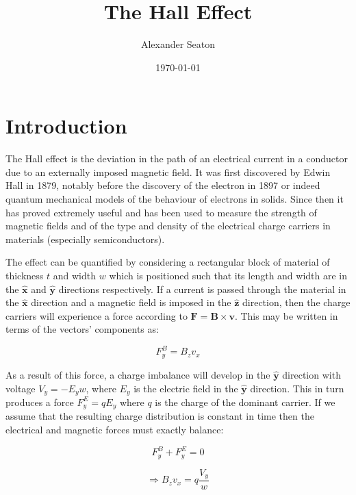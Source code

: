 \documentclass{article}
\title{The Hall Effect}
\date{\today}
\author{Alexander Seaton}
\begin{document}
	\maketitle
	\begin{abstract}
		
	\end{abstract}
	\section{Introduction}
		The Hall effect is the deviation in the path of an electrical current in a conductor due to an externally imposed magnetic field. It was first discovered by Edwin Hall in 1879, notably before the discovery of the electron in 1897 or indeed quantum mechanical models of the behaviour of electrons in solids. Since then it has proved extremely useful and has been used to measure the strength of magnetic fields and of the type and density of the electrical charge carriers in materials (especially semiconductors).
		
		The effect can be quantified by considering a rectangular block of material of thickness $t$ and width $w$ which is positioned such that its length and width are in the $\hat{\mathbf{x}}$ and $\hat{\mathbf{y}}$ directions respectively. If a current is passed through the material in the $\hat{\mathbf{x}}$ direction and a magnetic field is imposed in the $\hat{\mathbf{z}}$ direction, then the charge carriers will experience a force according to $\mathbf{F}=\mathbf{B}\times\mathbf{v}$. This may be written in terms of the vectors' components as:
		
		\begin{equation}
			F^B_y = B_zv_x
		\end{equation}
		
		\noindent As a result of this force, a charge imbalance will develop in the $\hat{\mathbf{y}}$ direction with voltage $V_y=-E_yw$, where $E_y$ is the electric field in the $\hat{\mathbf{y}}$ direction. This in turn produces a force $F^E_y = qE_y$ where $q$ is the charge of the dominant carrier. If we assume that the resulting charge distribution is constant in time then the electrical and magnetic forces must exactly balance:
		
		\begin{equation}
			F^B_y + F^E_y = 0
		\end{equation}
		
		\begin{equation}
			\Rightarrow B_zv_x = q\frac{V_y}{w}
		\end{equation}
		
\end{document}
